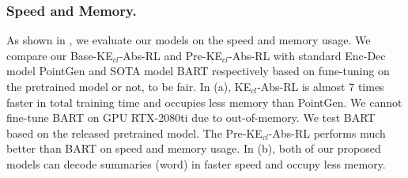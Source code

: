 \subsubsection{Speed and Memory.}
As shown in , we evaluate our models on the speed and memory usage.
We compare our Base-KE$_{cl}$-Abs-RL and Pre-KE$_{cl}$-Abs-RL with
standard Enc-Dec model PointGen and SOTA model BART respectively
based on fune-tuning on the pretrained model or not, to be fair.
In (a), 
KE$_{cl}$-Abs-RL is almost $7$ times faster in total training time and occupies less memory than PointGen.
We cannot fine-tune BART on GPU RTX-2080ti due to out-of-memory.
We test BART based on the released pretrained model.
The Pre-KE$_{cl}$-Abs-RL performs much better than BART on speed and memory usage.
In (b),
both of our proposed models can decode summaries (word) in faster speed
and occupy less memory.
\begin{table}[th]
\centering
\scriptsize
{}
\qquad
{}
\caption{Total time (T), speed and memory usage (M) of models during training and testing
         on RTX-2080ti.} 
\label{tab:eval_speed}
\end{table}

